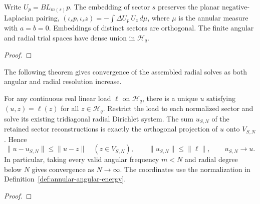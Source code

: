 \begin{supporting}
\begin{theorem}
\label{thm:annular-angular-energy-basic}
\leanok
Write $U_p=BL_{m(s)}p$. The embedding of sector $s$ preserves the planar
negative-Laplacian pairing, $(\iota_sp,\iota_sz)=-\int\Delta U_p\,U_z\,d\mu$,
where $\mu$ is the annular measure with $a=b=0$. Embeddings of distinct sectors
are orthogonal. The finite angular and radial trial spaces have dense union in
$\mathcal H_q$.
\end{theorem}
\begin{proof}
\leanok
\end{proof}
\end{supporting}


The following theorem gives convergence of the assembled radial solves as
both angular and radial resolution increase.

\begin{theorem}
\label{thm:annular-angular-convergence}
\leanok
For any continuous real linear load $\ell$ on $\mathcal H_q$, there is a unique
$u$ satisfying $(u,z)=\ell(z)$ for all $z\in\mathcal H_q$.
Restrict the load to each normalized sector and solve its existing tridiagonal
radial Dirichlet system. The sum $u_{S,N}$ of the retained sector reconstructions
is exactly the orthogonal projection of $u$ onto $V_{S,N}$. Hence
\[
 \|u-u_{S,N}\|\le\|u-z\|\quad(z\in V_{S,N}),\qquad
 \|u_{S,N}\|\le\|\ell\|,\qquad u_{S,N}\longrightarrow u.
\]
In particular, taking every valid angular frequency $m<N$ and radial degree
below $N$ gives convergence as $N\to\infty$. The coordinates use the normalization
in Definition~\ref{def:annular-angular-energy}.
\end{theorem}
\begin{proof}
\leanok
\end{proof}

